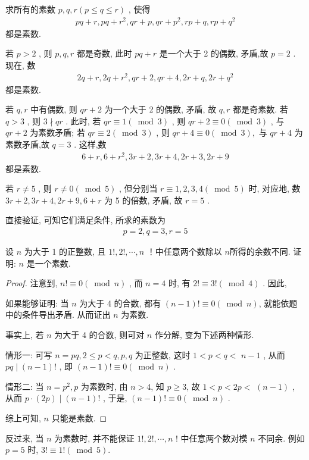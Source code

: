 \begin{example}
	求所有的素数 $p ,  q ,  r(p \leqslant q \leqslant r)$ , 使得
	\begin{align*}
		p q+r, p q+r^{2}, q r+p, q r+p^{2}, r p+q, r p+q^{2}
	\end{align*}
	都是素数.
\end{example}
\begin{solution}
	若 $p>2$ , 则 $p ,  q ,  r$ 都是奇数, 此时 $p q+r$ 是一个大于 2 的偶数, 矛盾,故 $p=2$ . 现在, 数
	\begin{align*}
		2 q+r, 2 q+r^{2}, q r+2, q r+4,2 r+q, 2 r+q^{2}
	\end{align*}
	都是素数.

	若 $q ,  r$ 中有偶数, 则 $q r+2$ 为一个大于 2 的偶数, 矛盾, 故 $q ,  r$ 都是奇素数. 若 $q>3$ , 则 $3 \nmid q r$ . 此时, 若 $q r \equiv 1(\bmod 3)$ , 则 $q r+2 \equiv 0(\bmod 3)$ , 与 $q r+2$ 为素数矛盾; 若 $q r \equiv 2(\bmod 3)$ , 则 $q r+4 \equiv 0(\bmod 3) , $ 与 $q r+4$ 为素数矛盾,故 $q=3$ . 这样,数
	\begin{align*}
		6+r, 6+r^{2}, 3 r+2,3 r+4,2 r+3,2 r+9
	\end{align*}
	都是素数.

	若 $r \neq 5$ , 则 $r \neq 0(\bmod 5)$ , 但分别当 $r \equiv 1,2,3,4(\bmod 5)$ 时, 对应地, 数 $3 r+2,3 r+4,2 r+9,6+r$ 为 5 的倍数, 矛盾, 故 $r=5$ .

	直接验证, 可知它们满足条件, 所求的素数为
	\begin{align*}
		p=2, q=3, r=5
	\end{align*}
\end{solution}

\begin{example}
	设 $n$ 为大于 1 的正整数, 且 $1!, 2!, \cdots, n$ ！中任意两个数除以 $n$所得的余数不同. 证明: $n$ 是一个素数.
\end{example}
\begin{proof}
	注意到,  $n!\equiv 0(\bmod n)$ , 而 $n=4$ 时, 有 $2!\equiv 3!(\bmod 4)$ . 因此,

	如果能够证明: 当 $n$ 为大于 4 的合数, 都有 $(n-1)!\equiv 0(\bmod n)$, 就能依题中的条件导出矛盾. 从而证出 $n$ 为素数.

	事实上, 若 $n$ 为大于 4 的合数, 则可对 $n$ 作分解, 变为下述两种情形.

	情形一: 可写 $n=p q, 2 \leqslant p<q, p, q$ 为正整数, 这时 $1<p<q<$ $n-1$ , 从而 $p q \mid(n-1)!$ , 即 $(n-1)!\equiv 0(\bmod n)$ .

	情形二: 当 $n=p^{2}, p$ 为素数时, 由 $n>4$, 知 $p \geqslant 3$, 故 $1<p<2 p<$ $(n-1)$ , 从而 $p \cdot(2 p) \mid(n-1)!$ , 于是,  $(n-1)!\equiv 0(\bmod n)$ .

	综上可知, $n$ 只能是素数.
\end{proof}
\begin{note}
	反过来, 当 $n$ 为素数时, 并不能保证 $1!, 2!, \cdots, n$ ! 中任意两个数对模 $n$ 不同余. 例如 $p=5$ 时, $3!\equiv 1!(\bmod 5)$.
\end{note}

